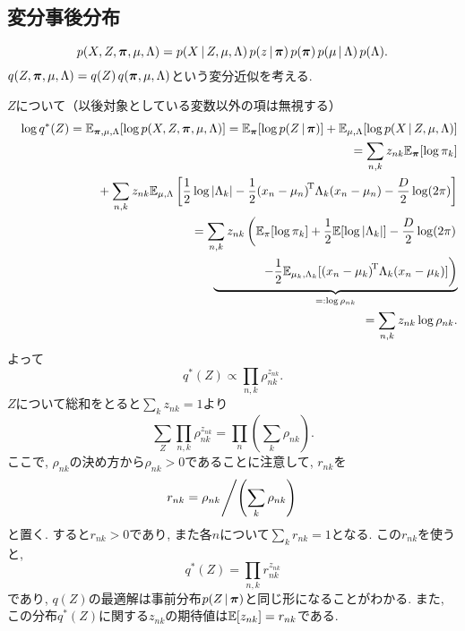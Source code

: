 \subsection{変分事後分布}
$$
p(X,Z,\bm{\pi},\mu,\Lambda)=p(X\,|\,Z,\mu,\Lambda)\,p(z\,|\,\bm{\pi})\,p(\bm{\pi})\,p(\mu\,|\,\Lambda)\,p(\Lambda).
$$
$q(Z,\bm{\pi},\mu,\Lambda)=q(Z)\,q(\bm{\pi},\mu,\Lambda)$という変分近似を考える.

$Z$について（以後対象としている変数以外の項は無視する）
\begin{eqnarray*}&&
\log q^*(Z)
 = \EE_{\vpi,\mu,\Lambda}[\log p(X,Z,\vpi,\mu,\Lambda)]
 = \EE_{\vpi}[\log p(Z\,|\,\vpi)]+\EE_{\mu,\Lambda}[\log p(X\,|\,Z,\mu,\Lambda)]
\\&&\hphantom{\log q^*(Z)}
 = \sum_{n,k} z_{nk} \EE_{\vpi}[\log \pi_k]
\\&&\hphantom{\log q^*(Z)={}}\quad
 + \sum_{n,k} z_{nk} \EE_{\mu,\Lambda}\left[\half\log |\Lambda_k|-\half\quads{\Lambda_k}{(x_n-\mu_n)}-\frac{D}{2}\log (2\pi)\right]
\\&&\hphantom{\log q^*(Z)}
 = \sum_{n,k} z_{nk}
   \left(
     \EE_\pi[\log \pi_k]
     +\half \EE[\log |\Lambda_k|]
     -\frac{D}{2}\log (2\pi)
   \right.
\\&&\hphantom{\log q^*(Z)= \sum_{n,k} z_{nk}}
 \underbrace{\qquad\qquad
   \left.
   -\half \EE_{\mu_k,\Lambda_k}[\quads{\Lambda_k}{(x_n-\mu_k)}]
   \right)}_{=:\log \rho_{nk}}
\\&&\hphantom{\log q^*(Z)}
 = \sum_{n,k} z_{nk} \log \rho_{nk}.
\end{eqnarray*}
よって
$$
q^*(Z) \propto \prod_{n,k} \rho_{nk}^{z_{nk}}.
$$
$Z$について総和をとると$\sum_k z_{nk}=1$より
$$
\sum_Z \prod_{n,k} \rho_{nk}^{z_{nk}}=\prod_n \left(\sum_k \rho_{nk}\right).
$$
ここで, $\rho_{nk}$の決め方から$\rho_{nk}>0$であることに注意して,
$r_{nk}$を
$$
r_{nk}=\rho_{nk}\kern-\nulldelimiterspace
  \left/\left(\sum_k \rho_{nk}\right)\right.
$$
と置く. すると$r_{nk} > 0$であり, また各$n$について$\sum_k r_{nk}=1$となる.
この$r_{nk}$を使うと,
$$
q^*(Z)=\prod_{n,k} r_{nk}^{z_{nk}}
$$
であり, $q(Z)$の最適解は事前分布$p(Z\,|\,\bm{\pi})$と同じ形になることがわかる.
また, この分布$q^*(Z)$に関する$z_{nk}$の期待値は$\mathbb{E}[z_{nk}]=r_{nk}$である.

